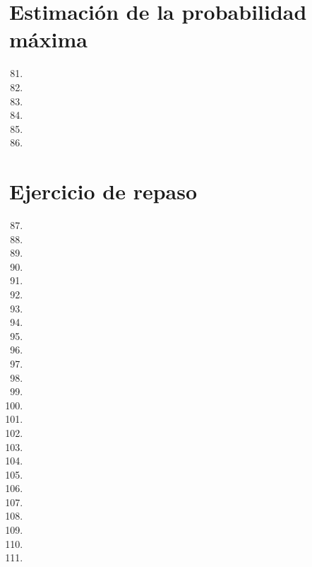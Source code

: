 \documentclass[a4paper,11pt]{article}
\theoremstyle{teoremas}
\theoremstyle{ejemplos}
\theoremstyle{definiciones}
\theoremstyle{lemas}
\begin{document}
\newpage

\section{Estimaci\'on de la probabilidad m\'axima}

\begin{enumerate}
 \setcounter{enumi}{80}
 \item 
 \item 
 \item 
 \item 
 \item 
 \item 
\end{enumerate}

\newpage

\section{Ejercicio de repaso}

\begin{enumerate}
 \setcounter{enumi}{86}
 \item 
 \item 
 \item 
 \item 
 \item 
 \newpage
 \item 
 \item 
 \item 
 \item 
 \item 
 \item 
 \item 
 \item 
 \item 
 \item 
 \item 
 \item 
 \item 
 \item 
 \item 
 \item 
 \item 
 \item 
 \item 
 \item 
\end{enumerate}
\end{document}
